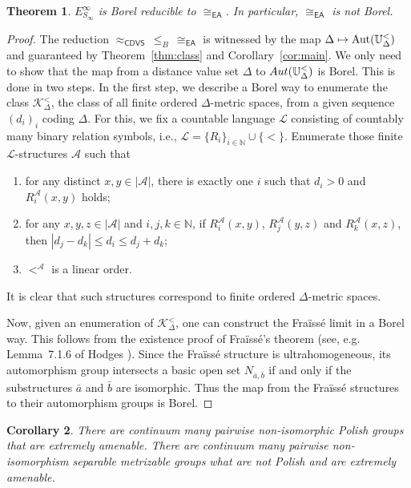 \documentclass{amsart}
\newtheorem{theorem}{Theorem}[section]
\newtheorem{corollary}[theorem]{Corollary}
\theoremstyle{definition}
\theoremstyle{remark}
\begin{document}
     \begin{theorem}\label{reductions}
        $E^\infty_{S_\infty}$ is Borel reducible to $\cong_{\mathsf{EA}}$. In particular, $\cong_{\mathsf{EA}}$ is not Borel.
     \end{theorem}
     \begin{proof} 
The reduction $\approx_{\mathsf{CDVS}}\, \leq_B \,\cong_{\mathsf{EA}}$ is witnessed by the map $\Delta\mapsto \mbox{\rm Aut}(\mathbb{U}^<_\Delta)$ and guaranteed by Theorem~\ref{thm:class} and Corollary~\ref{cor:main}. We only need to show that the map from a distance value set $\Delta$ to ${\rm Aut}(\mathbb{U}_\Delta^<)$ is Borel. This is done in two steps. In the first step, we describe a Borel way to enumerate the class $\mathcal{K}^<_\Delta$, the class of all finite ordered $\Delta$-metric spaces, from a given sequence $(d_i)_i$ coding $\Delta$. For this, we fix a countable language $\mathcal{L}$ consisting of countably many binary relation symbols, i.e., $\mathcal{L}=\{R_i\}_{i\in \mathbb{N}} \cup \{<\}$. Enumerate those finite $\mathcal{L}$-structures $\mathcal{A}$ such that 
\begin{enumerate}
\item[(i)] for any distinct $x,y\in|\mathcal{A}|$, there is exactly one $i$ such that $d_i>0$ and $R^{\mathcal{A}}_i(x,y)$ holds;
\item[(ii)] for any $x,y,z\in|\mathcal{A}|$ and $i,j,k\in\mathbb{N}$, if $R^{\mathcal{A}}_i(x,y)$, $R^{\mathcal{A}}_j(y,z)$ and $R^{\mathcal{A}}_k(x,z)$, then $|d_j-d_k|\leq d_i\leq d_j+d_k$;
\item[(iii)] $<^{\mathcal{A}}$ is a linear order.
\end{enumerate}
It is clear that such structures correspond to finite ordered $\Delta$-metric spaces. 

Now, given an enumeration of $\mathcal{K}^<_\Delta$, one can construct the Fra\"iss\'e limit in a Borel way. This follows from the existence proof of Fra\"iss\'e's theorem (see, e.g. Lemma~7.1.6 of Hodges \cite{Hodges}).  Since the Fra\"iss\'e structure is ultrahomogeneous, its automorphism group intersects a basic open set $N_{\bar{a},\bar{b}}$ if and only if the substructures $\bar{a}$ and $\bar{b}$ are isomorphic. Thus the map from the Fra\"iss\'e structures to their automorphism groups is Borel.  
\end{proof}


\begin{corollary} There are continuum many pairwise non-isomorphic Polish groups that are extremely amenable. There are continuum many pairwise non-isomorphism separable metrizable groups what are not Polish and are extremely amenable.
\end{corollary}
\end{document}
